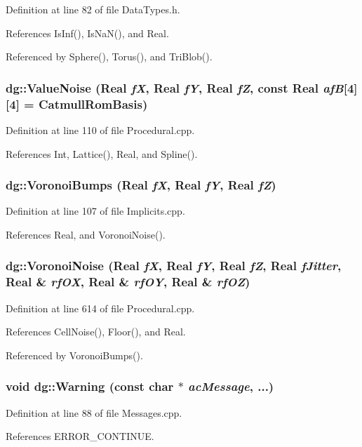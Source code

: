 Definition at line 82 of file Data\-Types.h.

References Is\-Inf(), Is\-Na\-N(), and Real.

Referenced by Sphere(), Torus(), and Tri\-Blob().
\subsubsection{ dg::Value\-Noise ({\bf Real} {\em f\-X}, {\bf Real} {\em f\-Y}, {\bf Real} {\em f\-Z}, const {\bf Real} {\em af\-B}[4][4] = Catmull\-Rom\-Basis)}\label{namespacedg_a129}




Definition at line 110 of file Procedural.cpp.

References Int, Lattice(), Real, and Spline().
\subsubsection{ dg::Voronoi\-Bumps ({\bf Real} {\em f\-X}, {\bf Real} {\em f\-Y}, {\bf Real} {\em f\-Z})}\label{namespacedg_a79}




Definition at line 107 of file Implicits.cpp.

References Real, and Voronoi\-Noise().
\subsubsection{ dg::Voronoi\-Noise ({\bf Real} {\em f\-X}, {\bf Real} {\em f\-Y}, {\bf Real} {\em f\-Z}, {\bf Real} {\em f\-Jitter}, {\bf Real} \& {\em rf\-OX}, {\bf Real} \& {\em rf\-OY}, {\bf Real} \& {\em rf\-OZ})}\label{namespacedg_a138}




Definition at line 614 of file Procedural.cpp.

References Cell\-Noise(), Floor(), and Real.

Referenced by Voronoi\-Bumps().
\subsubsection{\setlength{\rightskip}{0pt plus 5cm}void dg::Warning (const char $\ast$ {\em ac\-Message}, ...)\hspace{0.3cm}{\tt  [inline]}}\label{namespacedg_a123}




Definition at line 88 of file Messages.cpp.

References ERROR\_\-CONTINUE.